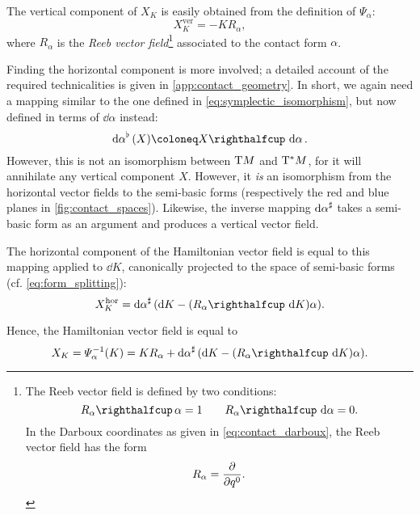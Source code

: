 The vertical component of \(X_K\) is easily obtained from the definition of \(\Psi_\alpha\):
\begin{equation}
    X_K^\text{ver} = -K R_\alpha,
    \label{eq:vertical_vf}
\end{equation}
where \(R_\alpha\) is the \emph{Reeb vector field}\footnote{
    The Reeb vector field is defined by two conditions: \cite{Libermann1987}
        \begin{equation}
     \intpr{R_\alpha}{\alpha} = 1 \qquad \intpr{R_\alpha}{\dd{\alpha}} = 0.
    \end{equation}
    In the Darboux coordinates as given in \cref{eq:contact_darboux}, the Reeb vector field has the form
    \begin{equation}
     R_\alpha = \pdv{}{q^0}.
    \end{equation}
} 
associated to the contact form \(\alpha\).

Finding the horizontal component is more involved; a detailed account of the required technicalities is given in \cref{app:contact_geometry}. In short, we again need a mapping similar to the one defined in \cref{eq:symplectic_isomorphism}, but now defined in terms of \(\dd{\alpha}\) instead:
\begin{equation}
    \toDual{\dd{\alpha}}(X) \coloneq \intpr{X}{\dd{\alpha}}.
    \label{eq:contact_isomorphism}
\end{equation}
However, this is not an isomorphism between \(\mathrm{T}M\) and \(\mathrm{T}^*M\), for it will annihilate any vertical component \(X\). However, it \emph{is} an isomorphism from the horizontal vector fields to the semi-basic forms (respectively the red and blue planes in \cref{fig:contact_spaces}). Likewise, the inverse mapping \(\dd{\alpha}^\sharp\) takes a semi-basic form as an argument and produces a vertical vector field. 

The horizontal component of the Hamiltonian vector field is equal to this mapping applied to \(\dd{K}\), canonically projected to the space of semi-basic forms (cf. \cref{eq:form_splitting}):
\begin{equation}
    X_K^\text{hor} = \fromDual{\dd{\alpha}}\qty(\dd{K} - (\intpr{R_\alpha}{\dd{K}})\alpha).
    \label{eq:horizontal_vf}
\end{equation}

Hence, the Hamiltonian vector field is equal to
\begin{equation}
    X_K = \Psi^{-1}_\alpha(K) = K R_\alpha + \fromDual{\dd{\alpha}}\qty(\dd{K} - (\intpr{R_\alpha}{\dd{K}})\alpha).
    \label{eq:contact_hamiltonian_vf}
\end{equation}

